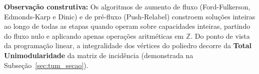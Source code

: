 \textbf{Observação construtiva:} Os algoritmos de aumento de fluxo (Ford-Fulkerson, Edmonds-Karp e Dinic) e de pré-fluxo (Push-Relabel) constroem soluções inteiras ao longo de todas as etapas quando operam sobre capacidades inteiras, partindo do fluxo nulo e aplicando apenas operações aritméticas em $\mathbb{Z}$. Do ponto de vista da programação linear, a integralidade dos vértices do poliedro decorre da \textbf{Total Unimodularidade} da matriz de incidência (demonstrada na Subseção~\ref{sec:tum_secao}).


